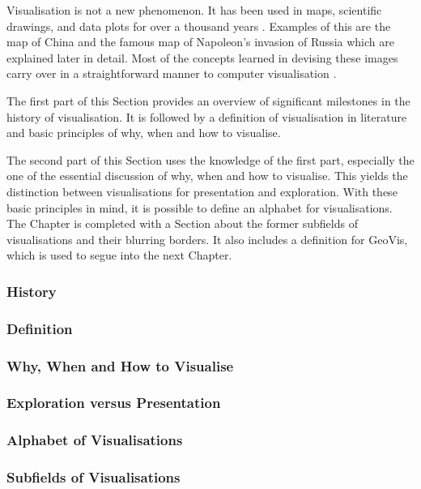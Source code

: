 Visualisation is not a new phenomenon. It has been used in maps, scientific drawings, and data plots for over a thousand years . Examples of this are the map of China and the famous map of Napoleon's invasion of Russia which are explained later in detail. Most of the concepts learned in devising these images carry over in a straightforward manner to computer visualisation .

The first part of this Section provides an overview of significant milestones in the history of visualisation. It is followed by a definition of visualisation in literature and basic principles of why, when and how to visualise.

\cbstart
The second part of this Section uses the knowledge of the first part, especially the one of the essential discussion of why, when and how to visualise. This yields the distinction between visualisations for presentation and exploration. With these basic principles in mind, it is possible to define an alphabet for visualisations. The Chapter is completed with a Section about the former subfields of visualisations and their blurring borders. It also includes a definition for \acl{GeoVis}, which is used to segue into the next Chapter.
\cbend

\subsubsection{History}
\label{s:history}


\subsubsection{Definition}
\label{s:definition}


\subsubsection{Why, When and How to Visualise}
\label{s:basics}


\subsubsection{Exploration versus Presentation}
\label{s:eda}


\subsubsection{Alphabet of Visualisations}


\subsubsection{Subfields of Visualisations}

